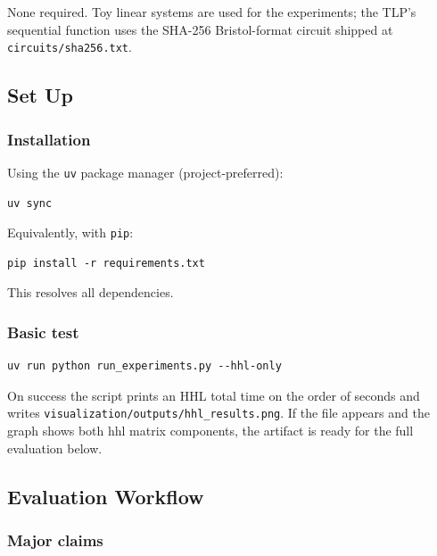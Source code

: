 \documentclass[nonacm,sigconf]{acmart}
\begin{document}
None required.  Toy linear systems are used for the experiments; the TLP's sequential function uses the SHA-256
Bristol-format circuit shipped at
\texttt{circuits/sha256.txt}.

\subsection{Set Up}

\subsubsection{Installation}

Using the \texttt{uv} package manager (project-preferred):
\begin{verbatim}
uv sync
\end{verbatim}
Equivalently, with \texttt{pip}:
\begin{verbatim}
pip install -r requirements.txt
\end{verbatim}
This resolves all dependencies.

\subsubsection{Basic test}

\begin{verbatim}
uv run python run_experiments.py --hhl-only
\end{verbatim}
On success the script prints an HHL total time on the order of
seconds and writes \texttt{visualization/outputs/hhl\_results.png}.
If the file appears and the graph shows both hhl matrix components, the artifact
is ready for the full evaluation below.

\subsection{Evaluation Workflow}

\subsubsection{Major claims}
\end{document}
